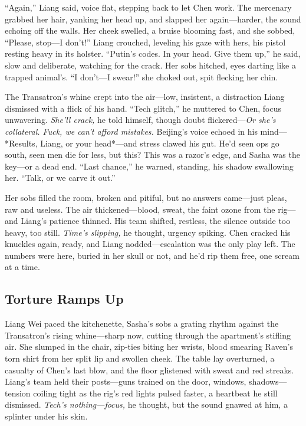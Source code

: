 \documentclass[12pt]{book}
\begin{document}
“Again,” Liang said, voice flat, stepping back to let Chen work. The mercenary grabbed her hair, yanking her head up, and slapped her again—harder, the sound echoing off the walls. Her cheek swelled, a bruise blooming fast, and she sobbed, “Please, stop—I don’t!” Liang crouched, leveling his gaze with hers, his pistol resting heavy in its holster. “Putin’s codes. In your head. Give them up,” he said, slow and deliberate, watching for the crack. Her sobs hitched, eyes darting like a trapped animal’s. “I don’t—I swear!” she choked out, spit flecking her chin.

The Transatron’s whine crept into the air—low, insistent, a distraction Liang dismissed with a flick of his hand. “Tech glitch,” he muttered to Chen, focus unwavering. \textit{She’ll crack,} he told himself, though doubt flickered—\textit{Or she’s collateral. Fuck, we can’t afford mistakes.} Beijing’s voice echoed in his mind—*Results, Liang, or your head*—and stress clawed his gut. He’d seen ops go south, seen men die for less, but this? This was a razor’s edge, and Sasha was the key—or a dead end. “Last chance,” he warned, standing, his shadow swallowing her. “Talk, or we carve it out.”

Her sobs filled the room, broken and pitiful, but no answers came—just pleas, raw and useless. The air thickened—blood, sweat, the faint ozone from the rig—and Liang’s patience thinned. His team shifted, restless, the silence outside too heavy, too still. \textit{Time’s slipping,} he thought, urgency spiking. Chen cracked his knuckles again, ready, and Liang nodded—escalation was the only play left. The numbers were here, buried in her skull or not, and he’d rip them free, one scream at a time.

\subsection{Torture Ramps Up}

Liang Wei paced the kitchenette, Sasha’s sobs a grating rhythm against the Transatron’s rising whine—sharp now, cutting through the apartment’s stifling air. She slumped in the chair, zip-ties biting her wrists, blood smearing Raven’s torn shirt from her split lip and swollen cheek. The table lay overturned, a casualty of Chen’s last blow, and the floor glistened with sweat and red streaks. Liang’s team held their posts—guns trained on the door, windows, shadows—tension coiling tight as the rig’s red lights pulsed faster, a heartbeat he still dismissed. \textit{Tech’s nothing—focus,} he thought, but the sound gnawed at him, a splinter under his skin.
\end{document}
